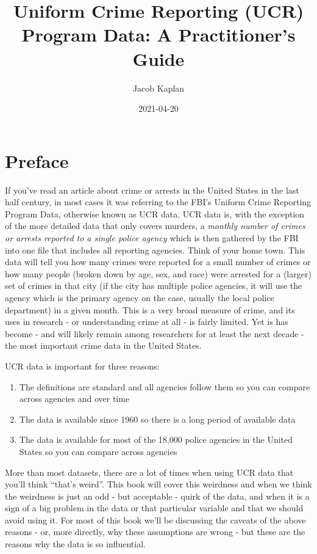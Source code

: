 \documentclass[
  12pt,
  openany]{book}
\title{Uniform Crime Reporting (UCR) Program Data: A Practitioner's Guide}
\author{Jacob Kaplan}
\date{2021-04-20}
\providecommand{\tightlist}{%
  \setlength{\itemsep}{0pt}\setlength{\parskip}{0pt}}
\begin{document}
\maketitle

{
\hypersetup{linkcolor=}
\setcounter{tocdepth}{2}
\tableofcontents
}
\listoffigures
{}
\hypertarget{preface}{%
\chapter{Preface}\label{preface}}

If you've read an article about crime or arrests in the United States in the last half century, in most cases it was referring to the FBI's Uniform Crime Reporting Program Data, otherwise known as UCR data. UCR data is, with the exception of the more detailed data that only covers murders, a \emph{monthly number of crimes or arrests reported to a single police agency} which is then gathered by the FBI into one file that includes all reporting agencies. Think of your home town. This data will tell you how many crimes were reported for a small number of crimes or how many people (broken down by age, sex, and race) were arrested for a (larger) set of crimes in that city (if the city has multiple police agencies, it will use the agency which is the primary agency on the case, usually the local police department) in a given month. This is a very broad measure of crime, and its uses in research - or understanding crime at all - is fairly limited. Yet is has become - and will likely remain among researchers for at least the next decade - the most important crime data in the United States.

UCR data is important for three reasons:

\begin{enumerate}
\def\labelenumi{\arabic{enumi}.}
\tightlist
\item
  The definitions are standard and all agencies follow them so you can compare across agencies and over time
\item
  The data is available since 1960 so there is a long period of available data
\item
  The data is available for most of the 18,000 police agencies in the United States so you can compare across agencies
\end{enumerate}

More than most datasets, there are a lot of times when using UCR data that you'll think ``that's weird''. This book will cover this weirdness and when we think the weirdness is just an odd - but acceptable - quirk of the data, and when it is a sign of a big problem in the data or that particular variable and that we should avoid using it. For most of this book we'll be discussing the caveats of the above reasons - or, more directly, why these assumptions are wrong - but these are the reasons why the data is so influential.
\end{document}
